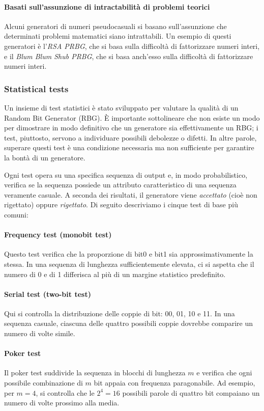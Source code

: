 \documentclass{report}
\begin{document}
\paragraph{Basati sull'assunzione di intractabilità di problemi teorici}
Alcuni generatori di numeri pseudocasuali si basano sull'assunzione che determinati problemi matematici siano intrattabili. Un esempio di questi generatori è l'\emph{RSA PRBG}, che si basa sulla difficoltà di fattorizzare numeri interi, e il \emph{Blum Blum Shub PRBG}, che si basa anch'esso sulla difficoltà di fattorizzare numeri interi.
\subsubsection{Statistical tests}

Un insieme di test statistici è stato sviluppato per valutare la qualità di un Random Bit Generator (RBG). È importante sottolineare che non esiste un modo per dimostrare in modo definitivo che un generatore sia effettivamente un RBG; i test, piuttosto, servono a individuare possibili debolezze o difetti. In altre parole, superare questi test è una condizione necessaria ma non sufficiente per garantire la bontà di un generatore.

Ogni test opera su una specifica sequenza di output e, in modo probabilistico, verifica se la sequenza possiede un attributo caratteristico di una sequenza veramente casuale. A seconda dei risultati, il generatore viene \emph{accettato} (cioè non rigettato) oppure \emph{rigettato}. Di seguito descriviamo i cinque test di base più comuni:

\paragraph{Frequency test (monobit test)}  
Questo test verifica che la proporzione di bit0 e bit1 sia approssimativamente la stessa. In una sequenza di lunghezza sufficientemente elevata, ci si aspetta che il numero di 0 e di 1 differisca al più di un margine statistico predefinito.

\paragraph{Serial test (two-bit test)}  
Qui si controlla la distribuzione delle coppie di bit: 00, 01, 10 e 11. In una sequenza casuale, ciascuna delle quattro possibili coppie dovrebbe comparire un numero di volte simile.

\paragraph{Poker test}  
Il poker test suddivide la sequenza in blocchi di lunghezza \(m\) e verifica che ogni possibile combinazione di \(m\) bit appaia con frequenza paragonabile. Ad esempio, per \(m=4\), si controlla che le \(2^4=16\) possibili parole di quattro bit compaiano un numero di volte prossimo alla media.
\end{document}
